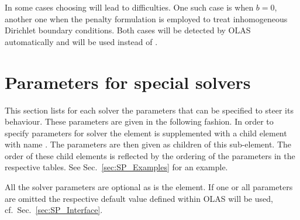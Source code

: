In some cases choosing  will lead to difficulties. One
such
case is when $b=0$, another one when the penalty formulation is employed to
treat inhomogeneous Dirichlet boundary conditions. Both cases will be detected
by OLAS automatically and  will be used instead of
.
%
%
\section{Parameters for special solvers}
%
%
This section lists for each solver the parameters that can be specified to
steer its behaviour. These parameters are given in the following fashion.
In order to specify parameters for solver  the 
element
is supplemented with a child element with name . The
parameters
are then given as children of this sub-element. The order of these child
elements is reflected by the ordering of the parameters in the respective
tables. See Sec.~\ref{sec:SP_Examples} for an example.

All the solver parameters are optional as is the  element. If one
or
all parameters are omitted the respective default value defined within OLAS
will be used, cf.~Sec.~\ref{sec:SP_Interface}.
%
%
